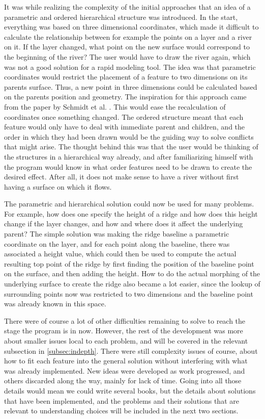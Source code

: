 \documentclass[a4paper,12pt]{report}
\begin{document}
It was while realizing the complexity of the initial approaches that an idea of a parametric and ordered hierarchical structure was introduced. In the start, everything was based on three dimensional coordinates, which made it difficult to calculate the relationship between for example the points on a layer and a river on it. If the layer changed, what point on the new surface would correspond to the beginning of the river? The user would have to draw the river again, which was not a good solution for a rapid modeling tool. The idea was that parametric coordinates would restrict the placement of a feature to two dimensions on its parents surface. Thus, a new point in three dimensions could be calculated based on the parents position and geometry. The inspiration for this approach came from the paper by Schmidt et al. \cite{CGF:CGF1129}. This would ease the recalculation of coordinates once something changed. The ordered structure meant that each feature would only have to deal with immediate parent and 
children, and the order in which they had been drawn would be the guiding way to solve conflicts that might arise. The thought behind this was that the user would be thinking of the structures in a hierarchical way already, and after familiarizing himself with the program would know in what order features need to be drawn to create the desired effect. After all, it does not make sense to have a river without first having a surface on which it flows.

The parametric and hierarchical solution could now be used for many problems. For example, how does one specify the height of a ridge and how does this height change if the layer changes, and how and where does it affect the underlying parent? The simple solution was making the ridge baseline a parametric coordinate on the layer, and for each point along the baseline, there was associated a height value, which could then be used to compute the actual resulting top point of the ridge by first finding the position of the baseline point on the surface, and then adding the height. How to do the actual morphing of the underlying surface to create the ridge also became a lot easier, since the lookup of surrounding points now was restricted to two dimensions and the baseline point was already known in this space.

There were of course a lot of other difficulties remaining to solve to reach the stage the program is in now. However, the rest of the development was more about smaller issues local to each problem, and will be covered in the relevant subsection in \ref{subsec:indepth}.  There were still complexity issues of course, about how to fit each feature into the general solution without interfering with what was already implemented. New ideas were developed as work progressed, and others discarded along the way, mainly for lack of time. Going into all those details would mean we could write several books, but the details about solutions that have been implemented, and the problems and their solutions that are relevant to understanding choices will be included in the next two sections.
\end{document}
